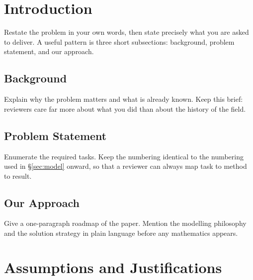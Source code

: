 \documentclass[12pt]{article}
\begin{document}
\newpage


\section{Introduction}
\label{sec:intro}

Restate the problem in your own words, then state precisely what you are asked to
deliver. A useful pattern is three short subsections: background, problem statement, and
our approach.

\subsection{Background}

Explain why the problem matters and what is already known. Keep this brief: reviewers
care far more about what you did than about the history of the field.

\subsection{Problem Statement}

Enumerate the required tasks. Keep the numbering identical to the numbering used in
\S\ref{sec:model} onward, so that a reviewer can always map task to method to result.

\subsection{Our Approach}

Give a one-paragraph roadmap of the paper. Mention the modelling philosophy and the
solution strategy in plain language before any mathematics appears.

\section{Assumptions and Justifications}
\label{sec:assumptions}
\end{document}
